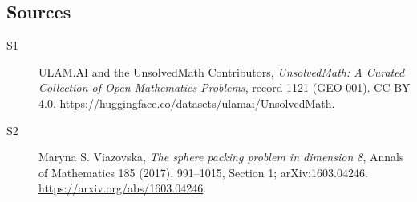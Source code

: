 \documentclass[11pt]{article}
\begin{document}
\subsection{Sources}
\begin{description}
\item[\hypertarget{source:1121:1}{S1}] ULAM.AI and the UnsolvedMath Contributors, \emph{UnsolvedMath: A Curated Collection of Open Mathematics Problems}, record 1121 (GEO-001). CC BY 4.0. \url{https://huggingface.co/datasets/ulamai/UnsolvedMath}.
\item[\hypertarget{source:1121:2}{S2}] Maryna S. Viazovska, \emph{The sphere packing problem in dimension 8}, Annals of Mathematics 185 (2017), 991--1015, Section 1; arXiv:1603.04246. \url{https://arxiv.org/abs/1603.04246}.
\end{description}
\label{end:1121}
\end{document}
